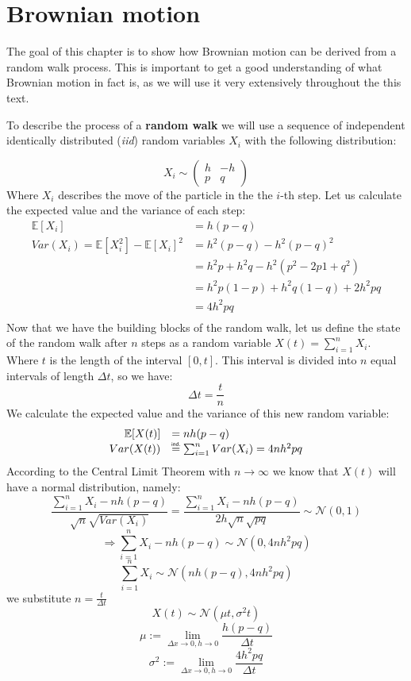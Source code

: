 \documentclass[times, utf8, diplomski]{fer}
\begin{document}

\section{Brownian motion}
The goal of this chapter is to show how Brownian motion can be derived from a random walk process. This is important to get a good understanding of what Brownian motion in fact is, as we will use it very extensively throughout the this text.

\noindent To describe the process of a \textbf{random walk} we will use a sequence of independent identically distributed (\textit{iid}) random variables $X_i$ with the following distribution:

$$ X_i \sim \left( \begin{array}{cc} h & -h \\
					p & q \end{array} \right)$$
Where $X_i$ describes the move of the particle in the the $i$-th step.
Let us calculate the expected value and the variance of each step:
$$
	\begin{array}{rl}
									\mathbb{E}[X_i] &= h(p-q) \\
		Var(X_i) = \mathbb{E}[X_i^2] - \mathbb{E}[X_i]^2 &= h^2(p-q) - h^2(p-q)^2 \\
										&= h^2p + h^2q - h^2(p^2 - 2p1 + q^2)\\
										&= h^2p(1-p) + h^2q(1-q) + 2h^2pq\\
										&= 4h^2pq \\
	\end{array}
$$
Now that we have the building blocks of the random walk, let us define the state of the random walk after $n$ steps as a random variable $X(t) = \sum_{i=1}^n X_i$. Where $t$ is the length of the interval $[0,t]$. This interval is divided into $n$ equal intervals of length $\Delta t$, so we have:
$$ \Delta t = \frac{t}{n}$$
We calculate the expected value and the variance of this new random variable:
$$
	\begin{array}{rl}
		\mathbb{E}[X(t)] &= nh(p-q) \\
		Var(X(t)) &\indeq \sum_{i=1}^n Var(X_i) = 4nh^2pq \\
	\end{array}
$$
According to the Central Limit Theorem with $n \rightarrow \infty$ we know that $X(t)$ will have a normal distribution, namely:
$$ \frac{\sum_{i=1}^n X_i - nh(p-q)}{\sqrt{n}\sqrt{Var(X_i)}} = \frac{\sum_{i=1}^n X_i - nh(p-q)}{2h\sqrt{n}\sqrt{pq}} \sim \mathcal{N}(0,1) $$
$$ \Rightarrow \sum_{i=1}^n X_i - nh(p-q) \sim \mathcal{N}(0,4nh^2pq)$$
$$ \sum_{i=1}^n X_i \sim \mathcal{N}(nh(p-q), 4nh^2pq)$$
we substitute $n=\frac{t}{\Delta t}$
$$ X(t) \sim \mathcal{N}(\mu t, \sigma^2t)$$
$$\mu := \lim_{\Delta x \to 0, h \to 0} \frac{h(p-q)}{\Delta t}$$
$$\sigma^2 := \lim_{\Delta x \to 0, h \to 0} \frac{4h^2pq}{\Delta t}$$
\end{document}
